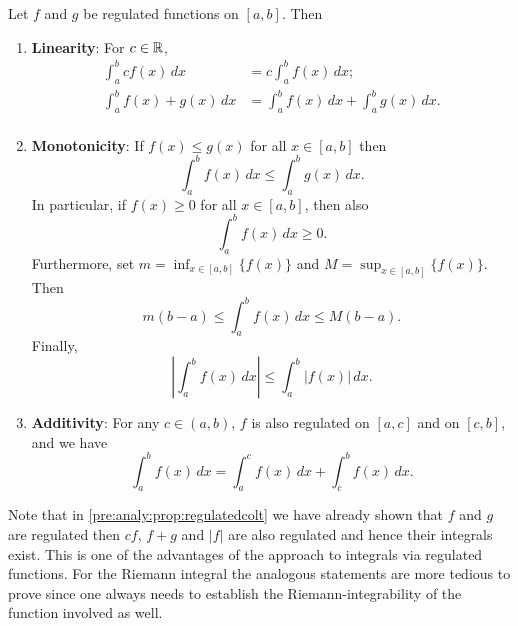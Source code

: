 \documentclass[10pt, a4paper]{article}
\begin{document}
\begin{theorem}\label{pre:analy:thm:coltforintegrals}
    Let $f$ and $g$ be regulated functions on $[a, b]$.
    Then
    \begin{enumerate}[label = (\roman*)]
        \item\textbf{Linearity}:
        For $c \in \mathbb{R}$,
        \begin{align*}
            \int_{a}^{b}cf(x)\,dx &= c\int_{a}^{b}f(x)\,dx; \\
            \int_{a}^{b}f(x) + g(x)\,dx &= \int_{a}^{b}f(x)\,dx + \int_{a}^{b}g(x)\,dx. \\
        \end{align*}

        \item\textbf{Monotonicity}:
        If $f(x) \leq g(x)$ for all $x \in [a, b]$ then
        \[
        \int_{a}^{b}f(x)\,dx \leq \int_{a}^{b}g(x)\,dx.
        \]
        In particular,
        if $f(x) \geq 0$ for all $x \in [a, b]$,
        then also
        \[
        \int_{a}^{b}f(x)\,dx \geq 0.
        \]
        Furthermore,
        set $m = \inf_{x \in [a, b]}\{f(x)\}$ and $M = \sup_{x \in [a, b]}\{f(x)\}$.
        Then
        \[
        m(b - a) \leq \int_{a}^{b}f(x)\,dx \leq M(b - a).
        \]
        Finally,
        \[
        \left|\int_{a}^{b}f(x)\,dx\right| \leq \int_{a}^{b}|f(x)|\,dx.
        \]

        \item\textbf{Additivity}:
        For any $c \in (a, b)$,
        $f$ is also regulated on $[a, c]$ and on $[c, b]$,
        and we have
        \[
        \int_{a}^{b}f(x)\,dx = \int_{a}^{c}f(x)\,dx +  \int_{c}^{b}f(x)\,dx.
        \]
    \end{enumerate}
\end{theorem}

\begin{remark}
    Note that in \autoref{pre:analy:prop:regulatedcolt} we have already shown that $f$ and $g$ are regulated then $cf$,
    $f + g$ and $|f|$ are also regulated and hence their integrals exist.
    This is one of the advantages of the approach to integrals via regulated functions.
    For the Riemann integral the analogous statements are more tedious to prove since one always needs to establish the Riemann-integrability of the function involved as well.
\end{remark}
\end{document}
